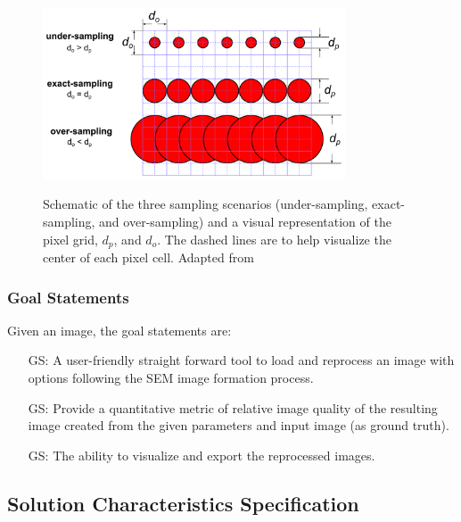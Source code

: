 \documentclass[12pt]{article}
\newcounter{goalnum} %
\begin{document}
\begin{figure}[h!]
\begin{center}
{
 \includegraphics[width=0.8\textwidth]{figures/sampling.png}
}
\caption{\label{fig_sampling} Schematic of the three sampling scenarios (under-sampling, exact-sampling, and over-sampling) and a visual representation of the pixel grid, $d_p$, and $d_o$. The dashed lines are to help visualize the center of each pixel cell. Adapted from \citet{lifshin_improving_2014}}
\end{center}
\end{figure}

\subsubsection{Goal Statements}

\noindent Given an image, the goal statements are:

\begin{itemize}

\item[GS\refstepcounter{goalnum}\thegoalnum \label{G_easeofuse}:] {
A user-friendly straight forward tool to load and reprocess an image with options following the SEM image formation process.
}

\item[GS\refstepcounter{goalnum}\thegoalnum \label{G_metric}:] {
Provide a quantitative metric of relative image quality of the resulting image created from the given parameters and input image (as ground truth).
}

\item[GS\refstepcounter{goalnum}\thegoalnum \label{G_visualize}:] {
The ability to visualize and export the reprocessed images.
}

\end{itemize}

\subsection{Solution Characteristics Specification}
\end{document}
